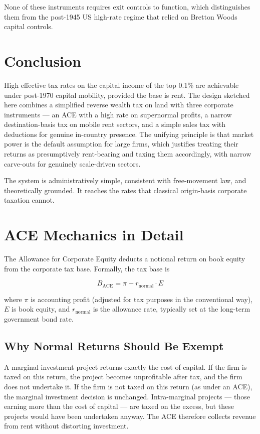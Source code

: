 \documentclass[11pt,a4paper]{article}
\begin{document}
None of these instruments requires exit controls to function, which distinguishes them from the post-1945 US high-rate regime that relied on Bretton Woods capital controls.

\section{Conclusion}

High effective tax rates on the capital income of the top 0.1\% are achievable under post-1970 capital mobility, provided the base is rent. The design sketched here combines a simplified reverse wealth tax on land with three corporate instruments — an ACE with a high rate on supernormal profits, a narrow destination-basis tax on mobile rent sectors, and a simple sales tax with deductions for genuine in-country presence. The unifying principle is that market power is the default assumption for large firms, which justifies treating their returns as presumptively rent-bearing and taxing them accordingly, with narrow carve-outs for genuinely scale-driven sectors.

The system is administratively simple, consistent with free-movement law, and theoretically grounded. It reaches the rates that classical origin-basis corporate taxation cannot.

\vspace{2em}

\appendix

\section{ACE Mechanics in Detail}

The Allowance for Corporate Equity deducts a notional return on book equity from the corporate tax base. Formally, the tax base is

\[
B_{\text{ACE}} = \pi - r_{\text{normal}} \cdot E
\]

where $\pi$ is accounting profit (adjusted for tax purposes in the conventional way), $E$ is book equity, and $r_{\text{normal}}$ is the allowance rate, typically set at the long-term government bond rate.

\subsection{Why Normal Returns Should Be Exempt}

A marginal investment project returns exactly the cost of capital. If the firm is taxed on this return, the project becomes unprofitable after tax, and the firm does not undertake it. If the firm is not taxed on this return (as under an ACE), the marginal investment decision is unchanged. Intra-marginal projects — those earning more than the cost of capital — are taxed on the excess, but these projects would have been undertaken anyway. The ACE therefore collects revenue from rent without distorting investment.
\end{document}
